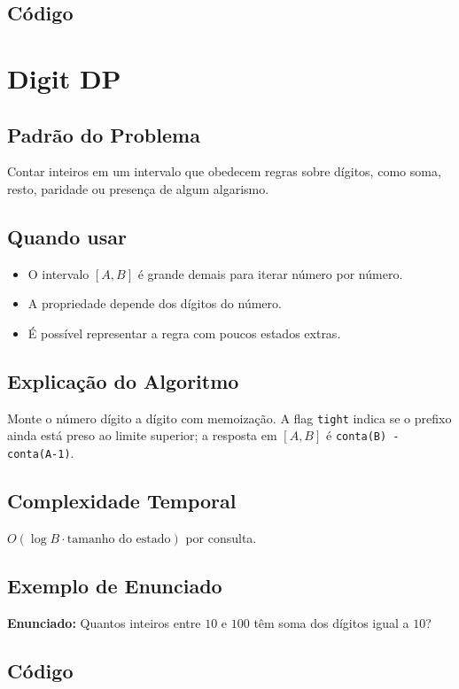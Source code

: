 \subsection{Código}

\section{Digit DP}

\subsection{Padrão do Problema}
Contar inteiros em um intervalo que obedecem regras sobre dígitos, como soma, resto, paridade ou presença de algum algarismo.

\subsection{Quando usar}
\begin{itemize}[nosep]
  \item O intervalo $[A,B]$ é grande demais para iterar número por número.
  \item A propriedade depende dos dígitos do número.
  \item É possível representar a regra com poucos estados extras.
\end{itemize}

\subsection{Explicação do Algoritmo}
Monte o número dígito a dígito com memoização. A flag \texttt{tight} indica se o prefixo ainda está preso ao limite superior; a resposta em $[A,B]$ é \texttt{conta(B) - conta(A-1)}.

\subsection{Complexidade Temporal}
$O(\log B \cdot \text{tamanho do estado})$ por consulta.

\subsection{Exemplo de Enunciado}
\begin{exemplodiabox}
\textbf{Enunciado:} Quantos inteiros entre $10$ e $100$ têm soma dos dígitos igual a $10$?
\end{exemplodiabox}

\subsection{Código}
